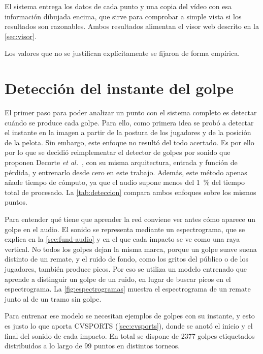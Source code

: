 El sistema entrega los datos de cada punto y una copia del vídeo con esa información dibujada encima, que sirve para comprobar a simple vista si los resultados son razonables.
Ambos resultados alimentan el visor web descrito en la \cref{sec:visor}.

Los valores que no se justifican explícitamente se fijaron de forma empírica.

\section{Detección del instante del golpe}
\label{sec:instante}

El primer paso para poder analizar un punto con el sistema completo es detectar cuándo se produce cada golpe.
Para ello, como primera idea se probó a detectar el instante en la imagen a partir de la postura de los jugadores y de la posición de la pelota.
Sin embargo, este enfoque no resultó del todo acertado.
Es por ello por lo que se decidió reimplementar el detector de golpes por sonido que proponen Decorte \textit{et al.}~\cite{decorte2024padel}, con su misma arquitectura, entrada y función de pérdida, y entrenarlo desde cero en este trabajo.
Además, este método apenas añade tiempo de cómputo, ya que el audio supone menos del 1~\% del tiempo total de procesado.
La \cref{tab:deteccion} compara ambos enfoques sobre los mismos puntos.

\begin{table}[htbp]
  \centering
  \caption{Detección del instante del golpe por imagen y por audio en los mismos puntos.}
  \label{tab:deteccion}
  
\end{table}

Para entender qué tiene que aprender la red conviene ver antes cómo aparece un golpe en el audio.
El sonido se representa mediante un espectrograma, que se explica en la \cref{sec:fund-audio} y en el que cada impacto se ve como una raya vertical.
No todos los golpes dejan la misma marca, porque un golpe suave suena distinto de un remate, y el ruido de fondo, como los gritos del público o de los jugadores, también produce picos.
Por eso se utiliza un modelo entrenado que aprende a distinguir un golpe de un ruido, en lugar de buscar picos en el espectrograma.
La \cref{fig:espectrogramas} muestra el espectrograma de un remate junto al de un tramo sin golpe.

Para entrenar ese modelo se necesitan ejemplos de golpes con su instante, y esto es justo lo que aporta CVSPORTS (\cref{sec:cvsports}), donde se anotó el inicio y el final del sonido de cada impacto.
En total se dispone de 2377 golpes etiquetados distribuidos a lo largo de 99 puntos en distintos torneos.

